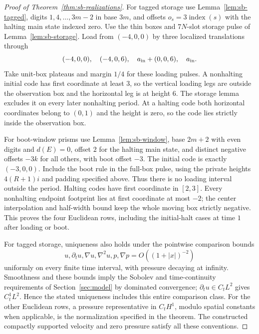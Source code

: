 \begin{proof}[Proof of Theorem~\ref{thm:sb-realizations}]
For tagged storage use Lemma~\ref{lem:sb-tagged}, digits $1,4,\ldots,3m-2$ in base $3m$, and offsets $o_s=3\operatorname{index}(s)$ with the halting main state indexed zero.  Use the thin boxes and $7N$-slot storage pulse of Lemma~\ref{lem:sb-storage}.  Load from $(-4,0,0)$ by three localized translations through
\[
 (-4,0,0),\quad(-4,0,6),\quad a_{\rm in}+(0,0,6),\quad a_{\rm in}.
\]
Take unit-box plateaus and margin $1/4$ for these loading pulses.  A nonhalting initial code has first coordinate at least $3$, so the vertical loading legs are outside the observation box and the horizontal leg is at height $6$.  The storage lemma excludes it on every later nonhalting period.  At a halting code both horizontal coordinates belong to $(0,1)$ and the height is zero, so the code lies strictly inside the observation box.

For boot-window prisms use Lemma~\ref{lem:sb-window}, base $2m+2$ with even digits and $d(E)=0$, offset $2$ for the halting main state, and distinct negative offsets $-3k$ for all others, with boot offset $-3$.  The initial code is exactly $(-3,0,0)$.  Include the boot rule in the full-box pulse, using the private heights $4(R+1)i$ and padding specified above.  Thus there is no loading interval outside the period.  Halting codes have first coordinate in $[2,3]$.  Every nonhalting endpoint footprint lies at first coordinate at most $-2$; the center interpolation and half-width bound keep the whole moving box strictly negative.  This proves the four Euclidean rows, including the initial-halt cases at time $1$ after loading or boot.

For tagged storage, uniqueness also holds under the pointwise comparison bounds
\[
 u,\partial_tu,\nabla u,\nabla^2u,p,\nabla p
       =O((1+|x|)^{-2})
\]
uniformly on every finite time interval, with pressure decaying at infinity.  Smoothness and these bounds imply the Sobolev and time-continuity requirements of Section~\ref{sec:model} by dominated convergence; $\partial_tu\in C_tL^2$ gives $C_t^1L^2$.  Hence the stated uniqueness includes this entire comparison class.  For the other Euclidean rows, a pressure representative in $C_tH^1$, modulo spatial constants when applicable, is the normalization specified in the theorem.  The constructed compactly supported velocity and zero pressure satisfy all these conventions.


\end{proof}
